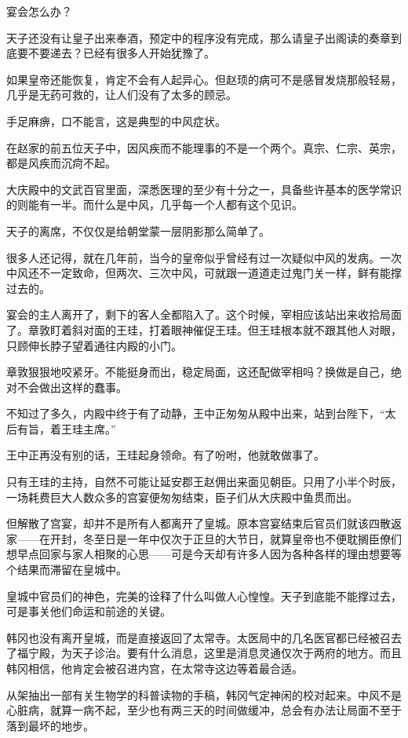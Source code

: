 宴会怎么办？

天子还没有让皇子出来奉酒，预定中的程序没有完成，那么请皇子出阁读的奏章到底要不要递去？已经有很多人开始犹豫了。

如果皇帝还能恢复，肯定不会有人起异心。但赵顼的病可不是感冒发烧那般轻易，几乎是无药可救的，让人们没有了太多的顾忌。

手足麻痹，口不能言，这是典型的中风症状。

在赵家的前五位天子中，因风疾而不能理事的不是一个两个。真宗、仁宗、英宗，都是风疾而沉疴不起。

大庆殿中的文武百官里面，深悉医理的至少有十分之一，具备些许基本的医学常识的则能有一半。而什么是中风，几乎每一个人都有这个见识。

天子的离席，不仅仅是给朝堂蒙一层阴影那么简单了。

很多人还记得，就在几年前，当今的皇帝似乎曾经有过一次疑似中风的发病。一次中风还不一定致命，但两次、三次中风，可就跟一道道走过鬼门关一样，鲜有能撑过去的。

宴会的主人离开了，剩下的客人全都陷入了。这个时候，宰相应该站出来收拾局面了。章敦盯着斜对面的王珪，打着眼神催促王珪。但王珪根本就不跟其他人对眼，只顾伸长脖子望着通往内殿的小门。

章敦狠狠地咬紧牙。不能挺身而出，稳定局面，这还配做宰相吗？换做是自己，绝对不会做出这样的蠢事。

不知过了多久，内殿中终于有了动静，王中正匆匆从殿中出来，站到台陛下，“太后有旨，着王珪主席。”

王中正再没有别的话，王珪起身领命。有了吩咐，他就敢做事了。

只有王珪的主持，自然不可能让延安郡王赵佣出来面见朝臣。只用了小半个时辰，一场耗费巨大人数众多的宫宴便匆匆结束，臣子们从大庆殿中鱼贯而出。

但解散了宫宴，却并不是所有人都离开了皇城。原本宫宴结束后官员们就该四散返家——在开封，冬至日是一年中仅次于正旦的大节日，就算皇帝也不便耽搁臣僚们想早点回家与家人相聚的心思——可是今天却有许多人因为各种各样的理由想要等个结果而滞留在皇城中。

皇城中官员们的神色，完美的诠释了什么叫做人心惶惶。天子到底能不能撑过去，可是事关他们命运和前途的关键。

韩冈也没有离开皇城，而是直接返回了太常寺。太医局中的几名医官都已经被召去了福宁殿，为天子诊治。要有什么消息，这里是消息灵通仅次于两府的地方。而且韩冈相信，他肯定会被召进内宫，在太常寺这边等着最合适。

从架抽出一部有关生物学的科普读物的手稿，韩冈气定神闲的校对起来。中风不是心脏病，就算一病不起，至少也有两三天的时间做缓冲，总会有办法让局面不至于落到最坏的地步。

